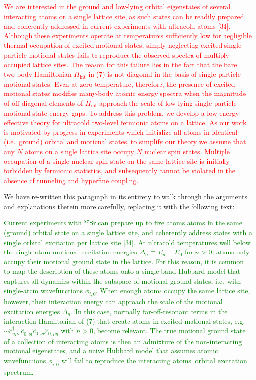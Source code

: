 \documentclass[preprint]{revtex4-1}
\renewcommand{\t}{\text} %
\renewcommand{\c}{\hat{c}}
\newcommand{\1}{\mathds{1}}
\newcommand{\red}[1]{\textcolor{red}{#1}}
\newcommand{\green}[1]{\textcolor{green}{#1}}
\begin{document}
\begin{enumerate}
  \red{We are interested in the ground and low-lying orbital
    eigenstates of several interacting atoms on a single lattice site,
    as such states can be readily prepared and coherently addressed in
    current experiments with ultracold atoms [34].  Although these
    experiments operate at temperatures sufficiently low for
    negligible thermal occupation of excited motional states, simply
    neglecting excited single-particle motional states fails to
    reproduce the observed spectra of multiply-occupied lattice sites.
    The reason for this failure lies in the fact that the bare
    two-body Hamiltonian $H_{\t{int}}$ in (7) is not diagonal in the
    basis of single-particle motional states.  Even at zero
    temperature, therefore, the presence of excited motional states
    modifies many-body atomic energy spectra when the magnitude of
    off-diagonal elements of $H_{\t{int}}$ approach the scale of
    low-lying single-particle motional state energy gaps.  To address
    this problem, we develop a low-energy effective theory for
    ultracold two-level fermionic atoms on a lattice.  As our work is
    motivated by progress in experiments which initialize all atoms in
    identical (i.e.~ground) orbital and motional states, to simplify
    our theory we assume that any $N$ atoms on a single lattice site
    occupy $N$ nuclear spin states.  Multiple occupation of a single
    nuclear spin state on the same lattice site is initially forbidden
    by fermionic statistics, and subsequently cannot be violated in
    the absence of tunneling and hyperfine coupling.}

  We have re-written this paragraph in its entirety to walk through
  the arguments and explanations therein more carefully, replacing it
  with the following text:

  \green{Current experiments with ${}^{87}$Sr can prepare up to five
    atoms atoms in the same (ground) orbital state on a single lattice
    site, and coherently address states with a single orbital
    excitation per lattice site [34].  At ultracold temperatures well
    below the single-atom motional excitation energies
    $\Delta_n\equiv E_n-E_0$ for $n>0$, atoms only occupy their
    motional ground state in the lattice.  For this reason, it is
    common to map the description of these atoms onto a single-band
    Hubbard model that captures all dynamics within the subspace of
    motional ground states, i.e.~with single-atom wavefunctions
    $\phi_{i,0}$.  When enough atoms occupy the same lattice site,
    however, their interaction energy can approach the scale of the
    motional excitation energies $\Delta_n$.  In this case, normally
    far-off-resonant terms in the interaction Hamiltonian of (7) that
    create atoms in excited motional states,
    e.g.~$\sim\c_{n\mu s}^\dag \c_{0,\nu t}^\dag \c_{0,\nu r}
    \c_{0,\mu q}$ with $n>0$, become relevant.  The true motional
    ground state of a collection of interacting atoms is then an
    admixture of the non-interacting motional eigenstates, and a naive
    Hubbard model that assumes atomic wavefunctions $\phi_{i,0}$ will
    fail to reproduce the interacting atoms' orbital excitation
    spectrum.}


\end{enumerate}
\end{document}
